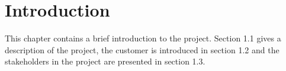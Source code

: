 \chapter{Introduction}

This chapter contains a brief introduction to the project. Section 1.1 gives a description of the project, the customer is introduced in section 1.2 and the stakeholders in the project are presented in section 1.3.
